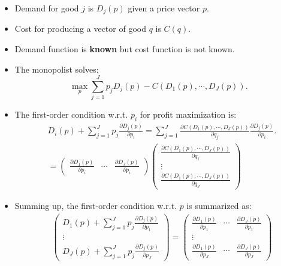 \documentclass[
]{book}
\begin{document}
\begin{itemize}
\item
  Demand for good \(j\) is \(D_j(p)\) given a price vector \(p\).
\item
  Cost for producing a vector of good \(q\) is \(C(q)\).
\item
  Demand function is \textbf{known} but cost function is not known.
\item
  The monopolist solves:
  \begin{equation}
  \max_{p} \sum_{j = 1}^J p_j D_j(p) - C(D_1(p), \cdots, D_J(p)).
  \end{equation}
\item
  The first-order condition w.r.t. \(p_i\) for profit maximization is:
  \begin{equation}
  \begin{split}
  &D_i(p) +  \sum_{j = 1}^J p_j \frac{\partial D_j(p)}{\partial p_i} = \sum_{j = 1}^J \frac{\partial C(D_1(p), \cdots, D_J(p))}{\partial q_j} \frac{\partial D_j(p)}{\partial p_i}.\\
  &= 
  \begin{pmatrix}
  \frac{\partial D_1(p)}{\partial p_i} & \cdots & \frac{\partial D_J(p)}{\partial p_i}
  \end{pmatrix}
  \begin{pmatrix}
  \frac{\partial C(D_1(p), \cdots, D_J(p))}{\partial q_1}\\
  \vdots\\
  \frac{\partial C(D_1(p), \cdots, D_J(p))}{\partial q_J}
  \end{pmatrix}
  \end{split}
  \end{equation}
\item
  Summing up, the first-order condition w.r.t. \(p\) is summarized as:
  \begin{equation}
  \begin{split}
  &\begin{pmatrix}
   D_1(p) + \sum_{j = 1}^J p_j \frac{\partial D_j(p)}{\partial p_1}\\
   \vdots\\
   D_J(p) + \sum_{j = 1}^J p_j \frac{\partial D_j(p)}{\partial p_J}
  \end{pmatrix} 
  =
  \begin{pmatrix}
  \frac{\partial D_1(p)}{\partial p_1} & \cdots & \frac{\partial D_J(p)}{\partial p_1}\\
  \vdots\\
  \frac{\partial D_1(p)}{\partial p_J} & \cdots & \frac{\partial D_J(p)}{\partial p_J}

\end{pmatrix}
\end{split}
\end{equation}
\end{itemize}
\end{document}
